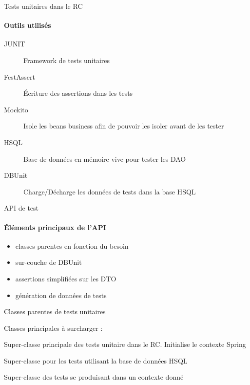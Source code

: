 \documentclass[compact]{beamer}%
\begin{document}
\begin{frame}{Tests unitaires dans le RC}
	\framesubtitle{Outils utilisés}
	
	\begin{description}
	\item[JUNIT] Framework de tests unitaires
	\item[FestAssert] Écriture des assertions dans les tests
	\item[Mockito] Isole les beans business afin de pouvoir les isoler avant de les tester
	\item[HSQL] Base de données en mémoire vive pour tester les DAO
	\item[DBUnit] Charge/Décharge les données de tests dans la base HSQL
	\end{description}

\end{frame}

\begin{frame}{API de test}
	\framesubtitle{Éléments principaux de l'API}

	\begin{itemize}
	\item classes parentes en fonction du besoin
	\item sur-couche de DBUnit
	\item assertions simplifiées sur les DTO
	\item génération de données de tests
	\end{itemize}
\end{frame}

\begin{frame}{Classes parentes de tests unitaires}

	Classes principales à surcharger :
	\begin{description}[<+->]
	\item[JunitTest] Super-classe principale des tests unitaire dans le RC. Initialise le contexte Spring
	\item[DBUnitJunitTest] Super-classe pour les tests utilisant la base de données HSQL
	\item[ContextedJunitTest] Super-classe des tests se produisant dans un contexte donné
	\end{description}
\end{frame}
\end{document}
